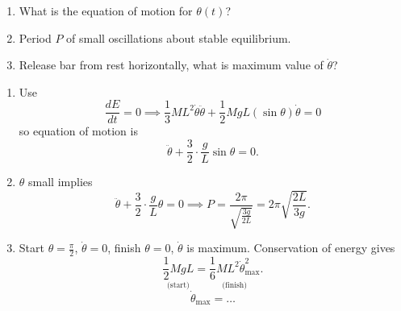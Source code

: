 \documentclass[10pt, a4paper]{article}
\begin{document}
\begin{example}[continues = dyn:exam:examp2]\phantom{}
    \begin{enumerate}[label = (\alph*)]
        \item What is the equation of motion for $\theta(t)$?

        \item Period $P$ of small oscillations about stable equilibrium.

        \item Release bar from rest horizontally,
        what is maximum value of $\dot{\theta}$?
    \end{enumerate}

    \begin{solution}
        \begin{enumerate}[label = (\alph*)]
            \item Use
            \[
            \frac{dE}{dt} = 0 \implies \frac{1}{3}ML ^ 2\dot{\theta}\ddot{\theta} + \frac{1}{2}MgL(\sin{\theta})\dot{\theta} = 0
            \]
            so equation of motion is
            \[
            \ddot{\theta} + \frac{3}{2}\cdot\frac{g}{L}\sin{\theta} = 0.
            \]

            \item $\theta$ small implies
            \[
            \ddot{\theta} + \frac{3}{2}\cdot\frac{g}{L}\theta = 0 \implies P = \frac{2\pi}{\sqrt{\frac{3g}{2L}}} = 2\pi\sqrt{\frac{2L}{3g}}.
            \]

            \item Start $\theta = \frac{\pi}{2}$,
            $\dot{\theta} = 0$,
            finish $\theta = 0$,
            $\dot{\theta}$ is maximum.
            Conservation of energy gives
            \[
            \underset{\text{(start)}}{\frac{1}{2}MgL} = \underset{\text{(finish)}}{\frac{1}{6}ML ^ 2\dot{\theta}_{\text{max}} ^ 2}.
            \]
            \[
            \dot{\theta}_{\text{max}} = \dotsc
            \]
        \end{enumerate}
    \end{solution}
\end{example}
\end{document}
